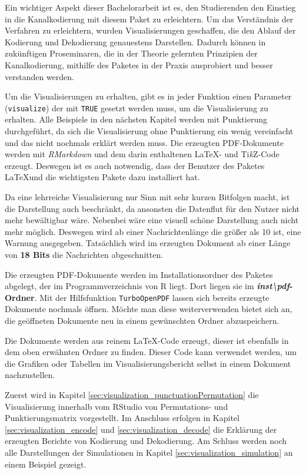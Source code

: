Ein wichtiger Aspekt dieser Bachelorarbeit ist es, den Studierenden den Einstieg in die Kanalkodierung mit diesem Paket zu erleichtern. Um das Verständnis der Verfahren zu erleichtern, wurden Visualisierungen geschaffen, die den Ablauf der Kodierung und Dekodierung genauestens Darstellen. Dadurch können in zukünftigen Proseminaren, die in der Theorie gelernten Prinzipien der Kanalkodierung, mithilfe des Paketes in der Praxis ausprobiert und besser verstanden werden.

Um die Visualisierungen zu erhalten, gibt es in jeder Funktion einen Parameter (\texttt{visualize}) der mit \texttt{TRUE} gesetzt werden muss, um die Visualisierung zu erhalten. Alle Beispiele in den nächsten Kapitel werden mit Punktierung durchgeführt, da sich die Visualisierung ohne Punktierung ein wenig vereinfacht und das nicht nochmals erklärt werden muss. Die erzeugten PDF-Dokumente werden mit \emph{RMarkdown} und dem darin enthaltenen \LaTeX - und Ti\textit{k}Z-Code erzeugt. Deswegen ist es auch notwendig, dass der Benutzer des Paketes \LaTeX und die wichtigsten Pakete dazu installiert hat.

Da eine lehrreiche Visualisierung nur Sinn mit sehr kurzen Bitfolgen macht, ist die Darstellung auch beschränkt, da ansonsten die Datenflut für den Nutzer nicht mehr bewältigbar wäre. Nebenbei wäre eine visuell schöne Darstellung auch nicht mehr möglich. Deswegen wird ab einer Nachrichtenlänge die größer als 10 ist, eine Warnung ausgegeben. Tatsächlich wird im erzeugten Dokument ab einer Länge von \textbf{18 Bits} die Nachrichten abgeschnitten.

Die erzeugten PDF-Dokumente werden im Installationsordner des Paketes abgelegt, der im Programmverzeichnis von R liegt. Dort liegen sie im \textbf{\emph{inst\textbackslash pdf}-Ordner}. Mit der Hilfsfunktion \texttt{TurboOpenPDF} lassen sich bereits erzeugte Dokumente nochmals öffnen. Möchte man diese weiterverwenden bietet sich an, die geöffneten Dokumente neu in einem gewünschten Ordner abzuspeichern.

Die Dokumente werden aus reinem \LaTeX -Code erzeugt, dieser ist ebenfalls in dem oben erwähnten Ordner zu finden. Dieser Code kann verwendet werden, um die Grafiken oder Tabellen im Visualisierungsbericht selbst in einem Dokument nachzustellen.

Zuerst wird in Kapitel \ref{sec:visualization_punctuationPermutation} die Visualisierung innerhalb vom RStudio von Permutations- und Punktierungsmatrix vorgestellt. Im Anschluss erfolgen in Kapitel \ref{sec:visualization_encode} und \ref{sec:visualization_decode} die Erklärung der erzeugten Berichte von Kodierung und Dekodierung. Am Schluss werden noch alle Darstellungen der Simulationen in Kapitel \ref{sec:visualization_simulation} an einem Beispiel gezeigt. 
